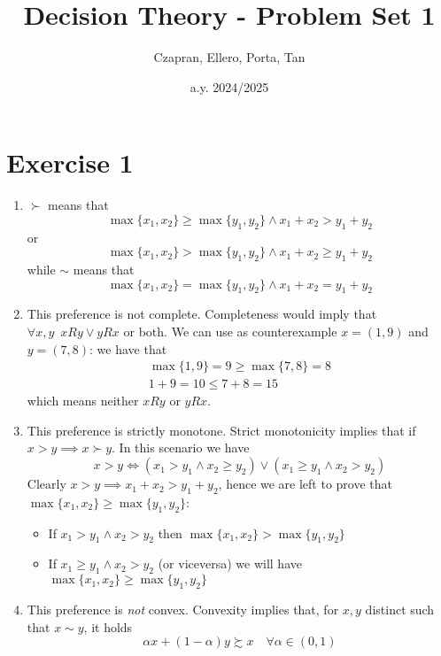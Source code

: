 \documentclass[12pt]{extarticle}
\title{Decision Theory - Problem Set 1}
\author{Czapran, Ellero, Porta, Tan}
\date{a.y. 2024/2025}
\numberwithin{table}{section}
\numberwithin{figure}{section}
\numberwithin{equation}{section}
\begin{document}
\maketitle

\section{Exercise 1}

\begin{enumerate}[label=\alph*.)]
    \item $\succ$ means that
          \begin{equation}
              \max \{ x_1, x_2 \} \geq \max \{ y_1, y_2 \} \land  x_1 + x_2 > y_1 + y_2
          \end{equation}
          or
          \begin{equation}
              \max \{ x_1, x_2 \} > \max \{ y_1, y_2 \} \land  x_1 + x_2 \geq y_1 + y_2
          \end{equation}
          while $\sim$ means that
          \begin{equation}
              \max \{ x_1, x_2 \} = \max \{ y_1, y_2 \} \land  x_1 + x_2 = y_1 + y_2
          \end{equation}

    \item This preference is not complete.
          Completeness would imply that $\forall x, y \enspace xRy \lor yRx$ or both.
          We can use as counterexample $x = (1, 9)$ and $y = (7,8)$: we have that
          \begin{gather}
              \max\{1, 9\} = 9 \geq \max \{7,8\} = 8\\
              1+9 = 10 \leq 7+8 = 15
          \end{gather}
          which means neither $xRy$ or $yRx$.

    \item This preference is strictly monotone.
          Strict monotonicity implies that if $x > y \implies x \succ y$.
          In this scenario we have
          \begin{equation}
              x > y \iff (x_1 > y_1 \land x_2 \geq y_2) \lor (x_1 \geq y_1 \land x_2 > y_2)
          \end{equation}
          Clearly $x > y \implies x_1 + x_2 > y_1 + y_2$, hence we are left to prove that $\max\{ x_1, x_2 \} \geq \max\{ y_1, y_2 \}$:
          \begin{itemize}
              \item If $x_1 > y_1 \land x_2 > y_2$ then $\max\{ x_1, x_2 \} > \max\{ y_1, y_2 \}$
              \item If $x_1 \geq y_1\land x_2 > y_2$ (or viceversa) we will have
                    $\max\{ x_1, x_2 \} \geq \max\{ y_1, y_2 \}$
          \end{itemize}
    \item This preference is \emph{not} convex.
          Convexity implies that, for $x, y$ distinct such that $x \sim y$, it holds
          \begin{equation}
              \alpha x + (1-\alpha)y \succsim x \quad \forall \alpha \in (0, 1)
          \end{equation}


\end{enumerate}
\end{document}
